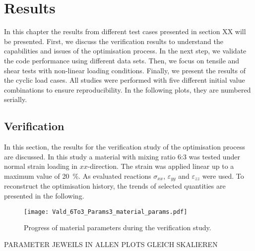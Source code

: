     \chapter{Results}\label{chap: results}

In this chapter the results from different test cases presented in section XX will be presented. First, we discuss the verification results to understand the capabilities and issues of the optimisation process. In the next step, we validate the code performance using different data sets. Then, we focus on tensile and shear tests with non-linear loading conditions. 
Finally, we present the results of the cyclic load cases. All studies were performed with five different initial value combinations to ensure reproducibility. In the following plots, they are numbered serially. 


\section{Verification}\label{sec: verification}

In this section, the results for the verification study of the optimisation process are discussed. In this study a material with mixing ratio 6:3 was tested under normal strain loading in $xx$-direction. The strain was applied linear up to a maximum value of 20 \%. As evaluated reactions $\sigma_{xx}$, $\varepsilon_{yy}$ and $\varepsilon_{zz}$ were used. To reconstruct the optimisation history, the trends of selected quantities are presented in the following.

\begin{figure}[H]
    \centering
    \texttt{[image: Vald\_6To3\_Params3\_material\_params.pdf]}
    \caption{Progress of material parameters during the verification study.}
    \label{fig:verifMaterialParams}
\end{figure}

PARAMETER JEWEILS IN ALLEN PLOTS GLEICH SKALIEREN \\



